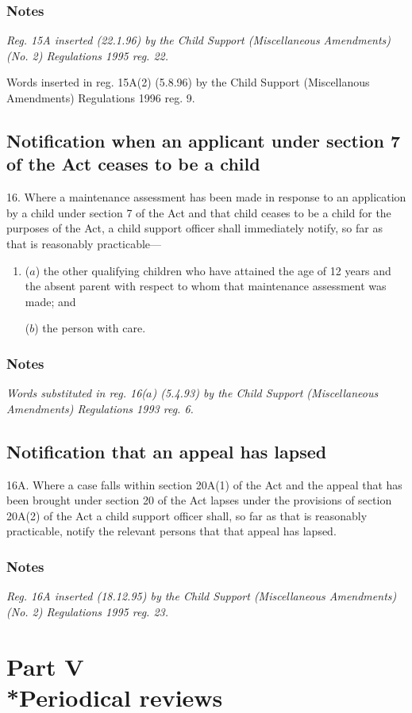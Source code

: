 \documentclass[a4paper]{article}
\newcommand\amendment[1]{\subsubsection*{Notes}{\itshape\frenchspacing\footnotesize #1 \par}}
\begin{document}
\amendment{
Reg. 15A inserted (22.1.96) by the Child Support (Miscellaneous Amendments) (No. 2) Regulations 1995 reg. 22.

Words inserted in reg. 15A(2) (5.8.96) by the Child Support (Miscellanous Amendments) Regulations 1996 reg. 9.
}

\subsection[16. Notification when an applicant under section 7 of the Act ceases to be a child]{\sloppy Notification when an applicant under section 7 of the Act ceases to be a child}

16.  Where a maintenance assessment has been made in response to an application by a child under section 7 of the Act and that child ceases to be a child for the purposes of the Act, a child support officer shall immediately notify, so far as that is reasonably practicable—
\begin{enumerate}\item[]
($a$) the other qualifying children 
who have attained the age of 12 years %
and the absent parent with respect to whom that maintenance assessment was made; and

($b$) the person with care.
\end{enumerate}

\amendment{
Words substituted in reg. 16($a$) (5.4.93) by the Child Support (Miscellaneous Amendments) Regulations 1993 reg. 6.
}

\subsection[16A. Notification that an appeal has lapsed]{Notification that an appeal has lapsed}

16A.  Where a case falls within section 20A(1) of the Act and the appeal that has been brought under section 20 of the Act lapses under the provisions of section 20A(2) of the Act a child support officer shall, so far as that is reasonably practicable, notify the relevant persons that that appeal has lapsed.

\amendment{
Reg. 16A inserted (18.12.95) by the Child Support (Miscellaneous Amendments) (No. 2) Regulations 1995 reg. 23.
}

\section[Part V --- Periodical reviews]{Part V\\*Periodical reviews}
\end{document}
